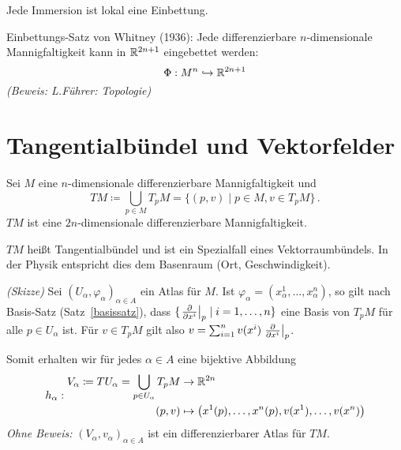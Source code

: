 \documentclass[a4paper,twoside,DIV15,BCOR12mm]{scrbook}
\renewcommand{\da}{\coloneqq}
\begin{document}
\begin{bemerkungen}
\item Jede Immersion ist lokal eine Einbettung.
\item Einbettungs-Satz von Whitney (1936): Jede differenzierbare $n$-dimensionale Mannigfaltigkeit kann in $\mathbb{R}^{2n+1}$ eingebettet werden:
\[
\Phi: M^n \hookrightarrow \mathbb{R}^{2n+1}
\]
\emph{(Beweis: L.Führer: Topologie)}
\end{bemerkungen}

\section{Tangentialbündel und Vektorfelder}

\begin{satz}[Tangentialbündel]
Sei $M$ eine $n$-dimensionale differenzierbare Mannigfaltigkeit und 
\[TM \da \bigcup_{p\in M} T_pM = \{(p,v)\mid p\in M, v\in T_pM\}\,.\]
$TM$ ist eine $2n$-dimensionale differenzierbare Mannigfaltigkeit.
\label{satz3}
\end{satz}
$TM$ heißt Tangentialbündel und ist ein Spezialfall eines Vektorraumbündels. In der Physik entspricht dies dem Basenraum (Ort, Geschwindigkeit).

\begin{beweis}
\emph{(Skizze)} Sei $(U_\alpha, \varphi_\alpha)_{\alpha \in A}$ ein Atlas für $M$. Ist $\varphi_\alpha = (x_\alpha^1,\ldots, x_\alpha^n)$, so gilt nach Basis-Satz (\mbox{Satz \ref{basissatz}}), dass $\{\left.\frac{\partial}{\partial x^{i}}\right|_p \mid i = 1,\ldots,n\}$ eine Basis von $T_pM$ für alle $p \in U_\alpha$ ist. Für $v\in T_pM$ gilt also $v= \sum_{i=1}^n v(x^i)\left.\frac{\partial}{\partial x^{i}}\right|_p$.

Somit erhalten wir für jedes $\alpha\in A$ eine bijektive Abbildung 
\[
h_\alpha:
\begin{aligned}
V_\alpha \da TU_\alpha = \bigcup_{p\in U_\alpha} T_pM &\to \MdR^{2n} \\
(p,v) &\mapsto \big(x^1(p), \ldots, x^n(p), v(x^1), \ldots, v(x^n)\big)
\end{aligned}
\]
\emph{Ohne Beweis:} $(V_\alpha, v_\alpha)_{\alpha\in A}$ ist ein differenzierbarer Atlas für $TM$.
\end{beweis}
\end{document}
